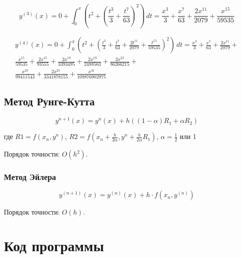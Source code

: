 \begin{equation}
\label{f3}
y^{(3)}(x) = 0 + \int_{0}^{x} (t^2 + \left(\frac{t^3}{3} + \frac{t^7}{63}\right)^2) \,dt = \frac{x^3}{3} + \frac{x^7}{63} + \frac{2x^{11}}{2079} + \frac{x^{15}}{59535}
\end{equation}

\begin{equation}
\begin{split}
\label{f4}
y^{(4)}(x) = 0 + \int_{0}^{x} (t^2 + \left(\frac{t^3}{3} + \frac{t^7}{63} + \frac{2t^{11}}{2079} + \frac{t^{15}}{59535}\right)^2) \,dt = \frac{x^3}{3} + \frac{x^7}{63} + \frac{2x^{11}}{2079} +\\
\frac{x^{15}}{59535} + \frac{2x^{15}}{93555} + \frac{2x^{19}}{3393495} + \frac{2x^{19}}{2488563} + \frac{2x^{23}}{86266215} + \\
\frac{x^{23}}{99411543} + \frac{2x^{27}}{3341878155}  + \frac{x^{31}}{109876902975}
\end{split}
\end{equation}

\section*{Метод Рунге-Кутта}

\begin{equation}
\label{rk}
y^{n+1}(x) = y^{n}(x) + h ((1-\alpha) R_1 + \alpha R_2)
\end{equation}\newline

где $R1 = f(x_{n}, y^{n})$, $R2 = f(x_{n} + \frac{h}{2\alpha}, y^{n} + \frac{h}{2\alpha}R_1)$, $\alpha = \frac{1}{2}$ или 1\newline

Порядок точности: $O(h^2)$.

\subsection*{Метод Эйлера}

\begin{equation}
\label{ey}
y^{(n+1)}(x) = y^{(n)}(x) + h \cdot f(x_{n}, y^{(n)})
\end{equation}

\indent Порядок точности: $O(h)$.


\chapter*{Код программы}


